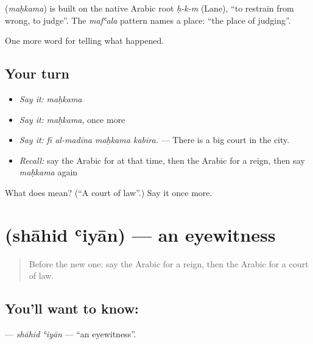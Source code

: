\begin{cousinweb}
\textbf{} (\emph{maḥkama}) is built on the native Arabic root \emph{ḥ-k-m} (Lane), \textquotedblleft{}to restrain from wrong, to judge\textquotedblright{}. The \emph{mafʿala} pattern names a place: \textquotedblleft{}the place of judging\textquotedblright{}.
\end{cousinweb}

\begin{grammarlens}[title={What you've built}]
One more word for telling what happened.
\end{grammarlens}

\subsection*{Your turn}
\begin{itemize}
\raggedright
  \item \emph{Say it:} \emph{maḥkama}
  \item \emph{Say it:} \emph{maḥkama}, once more
  \item \emph{Say it:} \emph{fī al-madīna maḥkama kabīra.} — There is a big court in the city.
  \item \emph{Recall:} say the Arabic for at that time, then the Arabic for a reign, then say \emph{maḥkama} again
\end{itemize}

\begin{tcolorbox}[breakable,colback=teal!4,colframe=teal!35!black,title={Before you move on}]
What does  mean? (\textquotedblleft{}A court of law\textquotedblright{}.) Say it once more.
\end{tcolorbox}
\section[\texorpdfstring{\ar{شاهد} \ar{عيان} (shāhid ʿiyān)}{شاهد عيان (shāhid ʿiyān)}]{  (shāhid ʿiyān) — an eyewitness}

\label{lesson:AR-C305-shahid-iyan}



\begin{quote}
Before the new one: say the Arabic for a reign, then the Arabic for a court of law.
\end{quote}

\subsection*{You'll want to know:  }
\textbf{ } — \emph{shāhid ʿiyān} — \textquotedblleft{}an eyewitness\textquotedblright{}.

